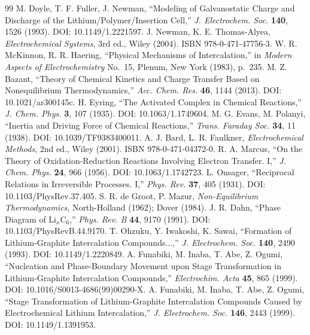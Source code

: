 \documentclass[11pt,a4paper]{article}
\begin{document}
\begin{thebibliography}{99}
 M. Doyle, T. F. Fuller, J. Newman, ``Modeling of Galvanostatic Charge and Discharge
  of the Lithium/Polymer/Insertion Cell,'' \emph{J. Electrochem. Soc.} \textbf{140}, 1526 (1993).
  DOI: 10.1149/1.2221597.
 J. Newman, K. E. Thomas-Alyea, \emph{Electrochemical Systems}, 3rd ed., Wiley (2004).
  ISBN 978-0-471-47756-3.
 W. R. McKinnon, R. R. Haering, ``Physical Mechanisms of Intercalation,'' in
  \emph{Modern Aspects of Electrochemistry} No.~15, Plenum, New York (1983), p.~235.
 M. Z. Bazant, ``Theory of Chemical Kinetics and Charge Transfer Based on
  Nonequilibrium Thermodynamics,'' \emph{Acc. Chem. Res.} \textbf{46}, 1144 (2013).
  DOI: 10.1021/ar300145c.
 H. Eyring, ``The Activated Complex in Chemical Reactions,'' \emph{J. Chem. Phys.}
  \textbf{3}, 107 (1935). DOI: 10.1063/1.1749604.
 M. G. Evans, M. Polanyi, ``Inertia and Driving Force of Chemical Reactions,''
  \emph{Trans. Faraday Soc.} \textbf{34}, 11 (1938). DOI: 10.1039/TF9383400011.
 A. J. Bard, L. R. Faulkner, \emph{Electrochemical Methods}, 2nd ed., Wiley (2001).
  ISBN 978-0-471-04372-0.
 R. A. Marcus, ``On the Theory of Oxidation-Reduction Reactions Involving Electron
  Transfer. I,'' \emph{J. Chem. Phys.} \textbf{24}, 966 (1956). DOI: 10.1063/1.1742723.
 L. Onsager, ``Reciprocal Relations in Irreversible Processes. I,'' \emph{Phys. Rev.}
  \textbf{37}, 405 (1931). DOI: 10.1103/PhysRev.37.405.
 S. R. de Groot, P. Mazur, \emph{Non-Equilibrium Thermodynamics},
  North-Holland (1962); Dover (1984).
 J. R. Dahn, ``Phase Diagram of Li$_x$C$_6$,'' \emph{Phys. Rev. B} \textbf{44}, 9170
  (1991). DOI: 10.1103/PhysRevB.44.9170.
 T. Ohzuku, Y. Iwakoshi, K. Sawai, ``Formation of Lithium-Graphite Intercalation
  Compounds...,'' \emph{J. Electrochem. Soc.} \textbf{140}, 2490 (1993). DOI: 10.1149/1.2220849.
 A. Funabiki, M. Inaba, T. Abe, Z. Ogumi, ``Nucleation and Phase-Boundary
  Movement upon Stage Transformation in Lithium-Graphite Intercalation Compounds,''
  \emph{Electrochim. Acta} \textbf{45}, 865 (1999). DOI: 10.1016/S0013-4686(99)00290-X.
 A. Funabiki, M. Inaba, T. Abe, Z. Ogumi, ``Stage Transformation of
  Lithium-Graphite Intercalation Compounds Caused by Electrochemical Lithium Intercalation,''
  \emph{J. Electrochem. Soc.} \textbf{146}, 2443 (1999). DOI: 10.1149/1.1391953.

\end{thebibliography}
\end{document}
